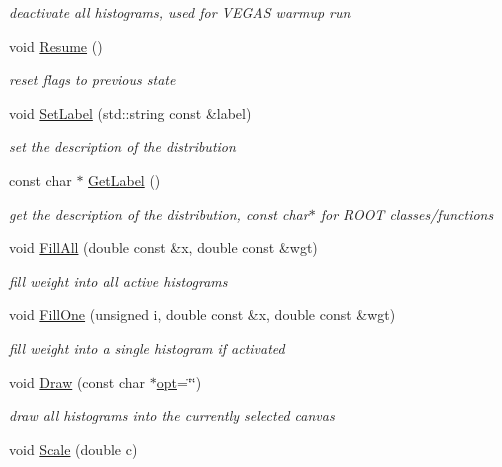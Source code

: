 \begin{DoxyCompactItemize}
\begin{DoxyCompactList}\small\item\em deactivate all histograms, used for V\-E\-G\-A\-S warmup run \end{DoxyCompactList}\item 
\hypertarget{classHistArray_ab6afeb98498add41c6f810eb68ed28ba}{void \hyperlink{classHistArray_ab6afeb98498add41c6f810eb68ed28ba}{Resume} ()}\label{classHistArray_ab6afeb98498add41c6f810eb68ed28ba}

\begin{DoxyCompactList}\small\item\em reset flags to previous state \end{DoxyCompactList}\item 
\hypertarget{classHistArray_a7fc002706ae4e6628d44a36e75c30463}{void \hyperlink{classHistArray_a7fc002706ae4e6628d44a36e75c30463}{Set\-Label} (std\-::string const \&label)}\label{classHistArray_a7fc002706ae4e6628d44a36e75c30463}

\begin{DoxyCompactList}\small\item\em set the description of the distribution \end{DoxyCompactList}\item 
\hypertarget{classHistArray_ac37b244345f0e56b68e597ee18558d8a}{const char $\ast$ \hyperlink{classHistArray_ac37b244345f0e56b68e597ee18558d8a}{Get\-Label} ()}\label{classHistArray_ac37b244345f0e56b68e597ee18558d8a}

\begin{DoxyCompactList}\small\item\em get the description of the distribution, const char$\ast$ for R\-O\-O\-T classes/functions \end{DoxyCompactList}\item 
void \hyperlink{classHistArray_ae8d7189d1f2b9710a3228deac3eb1fa4}{Fill\-All} (double const \&x, double const \&wgt)
\begin{DoxyCompactList}\small\item\em fill weight into all active histograms \end{DoxyCompactList}\item 
void \hyperlink{classHistArray_a38e7f00ba4f87c20ca1c3e0a5efc2ad9}{Fill\-One} (unsigned i, double const \&x, double const \&wgt)
\begin{DoxyCompactList}\small\item\em fill weight into a single histogram if activated \end{DoxyCompactList}\item 
void \hyperlink{classHistArray_a4ebaa67b67958c1ee70ebdb056b5a389}{Draw} (const char $\ast$\hyperlink{structopt}{opt}=\char`\"{}\char`\"{})
\begin{DoxyCompactList}\small\item\em draw all histograms into the currently selected canvas \end{DoxyCompactList}\item 
\hypertarget{classHistArray_a64fb4832bfab2d8e2e47e56d99902236}{void \hyperlink{classHistArray_a64fb4832bfab2d8e2e47e56d99902236}{Scale} (double c)}\label{classHistArray_a64fb4832bfab2d8e2e47e56d99902236}


\end{DoxyCompactItemize}
